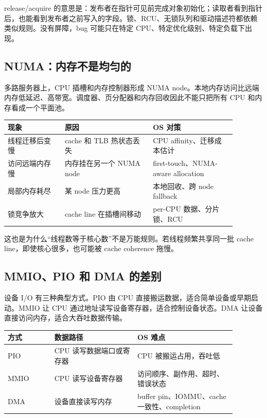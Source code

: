release/acquire 的意思是：发布者在指针可见前完成对象初始化；读取者看到指针后，也能看到发布者之前写入的字段。锁、RCU、无锁队列和驱动描述符都依赖类似规则。没有屏障，bug 可能只在特定 CPU、特定优化级别、特定负载下出现。

\subsection{NUMA：内存不是均匀的}

多路服务器上，CPU 插槽和内存控制器形成 NUMA node。本地内存访问比远端内存低延迟、高带宽。调度器、页分配器和内存回收因此不能只把所有 CPU 和内存看成一个平面池。

\begin{longtable}{p{0.22\linewidth}p{0.34\linewidth}p{0.32\linewidth}}
\toprule
现象 & 原因 & OS 对策 \\
\midrule
线程迁移后变慢 & cache 和 TLB 热状态丢失 & CPU affinity、迁移成本估计 \\
访问远端内存慢 & 内存挂在另一个 NUMA node & first-touch、NUMA-aware allocation \\
局部内存耗尽 & 某 node 压力更高 & 本地回收、跨 node fallback \\
锁竞争放大 & cache line 在插槽间移动 & per-CPU 数据、分片锁、RCU \\
\bottomrule
\end{longtable}

这也是为什么“线程数等于核心数”不是万能规则。若线程频繁共享同一批 cache line，即使核心很多，也可能被 cache coherence 拖慢。

\subsection{MMIO、PIO 和 DMA 的差别}

设备 I/O 有三种典型方式。PIO 由 CPU 直接搬运数据，适合简单设备或早期启动。MMIO 让 CPU 通过地址读写设备寄存器，适合控制设备状态。DMA 让设备直接访问内存，适合大吞吐数据传输。

\begin{longtable}{p{0.18\linewidth}p{0.32\linewidth}p{0.38\linewidth}}
\toprule
方式 & 数据路径 & OS 难点 \\
\midrule
PIO & CPU 读写数据端口或寄存器 & CPU 被搬运占用，吞吐低 \\
MMIO & CPU 读写设备寄存器 & 访问顺序、副作用、超时、错误状态 \\
DMA & 设备直接读写内存 & buffer pin、IOMMU、cache 一致性、completion \\
\bottomrule
\end{longtable}

